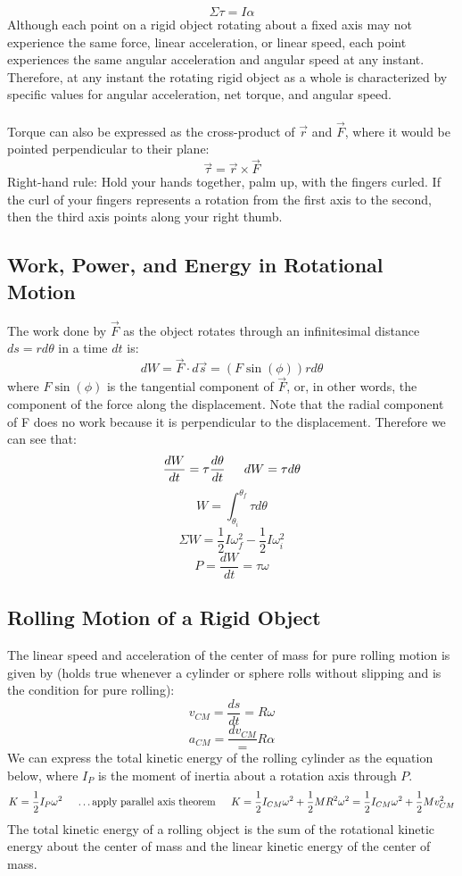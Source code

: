 \documentclass{article}
\begin{document}
        \[
        	\Sigma\tau=I\alpha
        \]
        Although each point on a rigid object rotating about a fixed axis may not experience the same force, linear acceleration, or linear speed, each point experiences the same angular acceleration and angular speed at any instant. Therefore, at any instant the rotating rigid object as a whole is characterized by specific values for angular acceleration, net torque, and angular speed.\\\\
        Torque can also be expressed as the cross-product of $\vec{r}$ and $\vec{F}$, where it would be pointed perpendicular to their plane:
        \[
        	\vec{\tau}=\vec{r}\times\vec{F}
        \]
        Right-hand rule: Hold your hands together, palm up, with the fingers curled. If the curl of your fingers represents a rotation from the first axis to the second, then the third axis points along your right thumb.
        
	\subsection{Work, Power, and Energy in Rotational Motion}
    	The work done by $\vec{F}$ as the object rotates through an infinitesimal distance $ds=rd\theta$ in a time $dt$ is:
        \[
        	dW=\vec{F}\cdot d\vec{s}=(F\sin(\phi))rd\theta
        \]
        where $F\sin(\phi)$ is the tangential component of $\vec{F}$, or, in other words, the component of the force along the displacement. Note that the radial component of F does no work because it is perpendicular to the displacement. Therefore we can see that:
        \[
        	\frac{dW}{dt}=\tau\frac{d\theta}{dt} \indent
            dW=\tau d\theta
        \]
        \[
        	W=\int_{\theta_i}^{\theta_f}\tau d\theta
        \]
        \[
        	\Sigma W=\frac{1}{2}I\omega_f^2-\frac{1}{2}I\omega_i^2
        \]
        \[
        	P=\frac{dW}{dt}=\tau\omega
        \]
        
	\subsection{Rolling Motion of a Rigid Object}
    	The linear speed and acceleration of the center of mass for pure rolling motion is given by (holds true whenever a cylinder or sphere rolls without slipping and is the condition for pure rolling):
        \[
        	v_{CM}=\frac{ds}{dt}=R\omega
        \]
        \[
        	a_{CM}=\frac{dv_{CM}}=R\alpha
        \]
        We can express the total kinetic energy of the rolling cylinder as the equation below, where $I_P$ is the moment of inertia about a rotation axis through $P$.
        \[
        	K=\frac{1}{2}I_P\omega^2 \indent
            \text{\ldots apply parallel axis theorem} \indent
            K=\frac{1}{2}I_{CM}\omega^2+\frac{1}{2}MR^2\omega^2=\frac{1}{2}I_{CM}\omega^2+\frac{1}{2}Mv_{CM}^2
        \]
        The total kinetic energy of a rolling object is the sum of the rotational kinetic energy about the center of mass and the linear kinetic energy of the center of mass.
        
\end{document}

